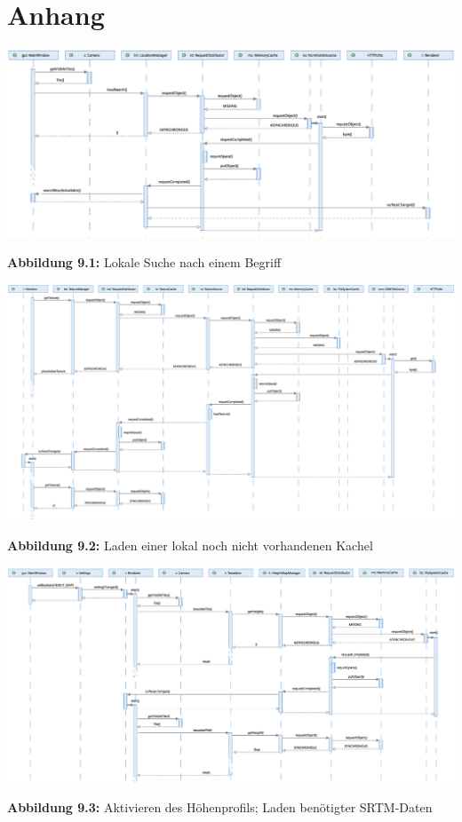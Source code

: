 \documentclass[10pt]{scrreprt}
\begin{document}
\chapter{Anhang}
\centering
\thispagestyle{empty}
\includegraphics[scale=0.45,angle=90,origin=c]{sequenz-search.eps}
\hspace{5mm}
\begin{rotate}{90}
\textbf{Abbildung 9.1:} Lokale Suche nach einem Begriff
\end{rotate}

\newpage
{}
\thispagestyle{empty}
\includegraphics[scale=0.45,angle=90,origin=c]{sequenz-osmtile.eps}
\hspace{5mm}
\begin{rotate}{90}
\textbf{Abbildung 9.2:} Laden einer lokal noch nicht vorhandenen Kachel
\end{rotate}

\newpage
\thispagestyle{empty}
\vspace*{1cm}
\includegraphics[scale=0.45,angle=90,origin=c]{sequenz-height.eps}
\hspace{5mm}
\begin{rotate}{90}
\textbf{Abbildung 9.3:} Aktivieren des Höhenprofils; Laden benötigter SRTM-Daten
\end{rotate}

\restoregeometry
\end{document}
